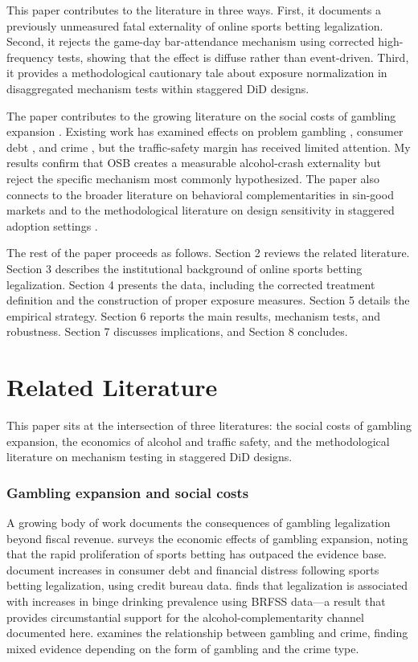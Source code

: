 \documentclass[12pt]{article}
\begin{document}
This paper contributes to the literature in three ways. First, it documents a previously unmeasured fatal externality of online sports betting legalization. Second, it rejects the game-day bar-attendance mechanism using corrected high-frequency tests, showing that the effect is diffuse rather than event-driven. Third, it provides a methodological cautionary tale about exposure normalization in disaggregated mechanism tests within staggered DiD designs.

The paper contributes to the growing literature on the social costs of gambling expansion \citep{Gruber2023}. Existing work has examined effects on problem gambling \citep{Swanson2023}, consumer debt \citep{BakerEtAl2023}, and crime \citep{Humphreys2021}, but the traffic-safety margin has received limited attention. My results confirm that OSB creates a measurable alcohol-crash externality but reject the specific mechanism most commonly hypothesized. The paper also connects to the broader literature on behavioral complementarities in sin-good markets \citep{CookMoore1993, CarpenterDobkin2011} and to the methodological literature on design sensitivity in staggered adoption settings \citep{CallawayAndSantAnna2021, SunAbraham2021}.

The rest of the paper proceeds as follows. Section 2 reviews the related literature. Section 3 describes the institutional background of online sports betting legalization. Section 4 presents the data, including the corrected treatment definition and the construction of proper exposure measures. Section 5 details the empirical strategy. Section 6 reports the main results, mechanism tests, and robustness. Section 7 discusses implications, and Section 8 concludes.


\section{Related Literature}

This paper sits at the intersection of three literatures: the social costs of gambling expansion, the economics of alcohol and traffic safety, and the methodological literature on mechanism testing in staggered DiD designs.

\subsubsection*{Gambling expansion and social costs} A growing body of work documents the consequences of gambling legalization beyond fiscal revenue. \citet{Gruber2023} surveys the economic effects of gambling expansion, noting that the rapid proliferation of sports betting has outpaced the evidence base. \citet{BakerEtAl2023} document increases in consumer debt and financial distress following sports betting legalization, using credit bureau data. \citet{Swanson2023} finds that legalization is associated with increases in binge drinking prevalence using BRFSS data---a result that provides circumstantial support for the alcohol-complementarity channel documented here. \citet{Humphreys2021} examines the relationship between gambling and crime, finding mixed evidence depending on the form of gambling and the crime type.
\end{document}
